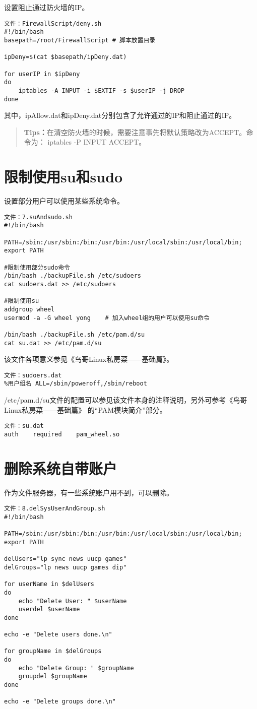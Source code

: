 设置阻止通过防火墙的IP。
\begin{Verbatim}[]
文件：FirewallScript/deny.sh
#!/bin/bash
basepath=/root/FirewallScript # 脚本放置目录

ipDeny=$(cat $basepath/ipDeny.dat)

for userIP in $ipDeny
do
	iptables -A INPUT -i $EXTIF -s $userIP -j DROP
done
\end{Verbatim}

其中，ipAllow.dat和ipDeny.dat分别包含了允许通过的IP和阻止通过的IP。

\begin{quote}
\kaishu
\textbf{Tips：}在清空防火墙的时候，需要注意事先将默认策略改为ACCEPT。命令为：%
iptables -P INPUT ACCEPT。
\end{quote}


\section{限制使用su和sudo}
设置部分用户可以使用某些系统命令。
\begin{Verbatim}[]
文件：7.suAndsudo.sh
#!/bin/bash

PATH=/sbin:/usr/sbin:/bin:/usr/bin:/usr/local/sbin:/usr/local/bin; export PATH

#限制使用部分sudo命令
/bin/bash ./backupFile.sh /etc/sudoers
cat sudoers.dat >> /etc/sudoers

#限制使用su
addgroup wheel
usermod -a -G wheel yong	# 加入wheel组的用户可以使用su命令

/bin/bash ./backupFile.sh /etc/pam.d/su
cat su.dat >> /etc/pam.d/su
\end{Verbatim}

该文件各项意义参见《鸟哥Linux私房菜——基础篇》。
\begin{Verbatim}[]
文件：sudoers.dat
%用户组名 ALL=/sbin/poweroff,/sbin/reboot
\end{Verbatim}

/etc/pam.d/su文件的配置可以参见该文件本身的注释说明，另外可参考《鸟哥Linux私房菜——基础篇》%
的“PAM模块简介”部分。
\begin{Verbatim}[]
文件：su.dat
auth	required	pam_wheel.so
\end{Verbatim}

\section{删除系统自带账户}
作为文件服务器，有一些系统账户用不到，可以删除。
\begin{Verbatim}[]
文件：8.delSysUserAndGroup.sh
#!/bin/bash

PATH=/sbin:/usr/sbin:/bin:/usr/bin:/usr/local/sbin:/usr/local/bin; export PATH

delUsers="lp sync news uucp games"
delGroups="lp news uucp games dip"

for userName in $delUsers
do
	echo "Delete User: " $userName
	userdel $userName
done

echo -e "Delete users done.\n"

for groupName in $delGroups
do
	echo "Delete Group: " $groupName
	groupdel $groupName
done

echo -e "Delete groups done.\n"
\end{Verbatim}

